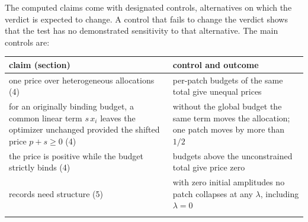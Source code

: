 The computed claims come with designated controls, alternatives on which
the verdict is expected to change. A control that fails to change the
verdict shows that the test has no demonstrated sensitivity to that
alternative. The main controls are:

\begin{longtable}[]{@{}ll@{}}
\toprule
\begin{minipage}[b]{0.47\columnwidth}\raggedright
claim (section)\strut
\end{minipage} & \begin{minipage}[b]{0.47\columnwidth}\raggedright
control and outcome\strut
\end{minipage}\tabularnewline
\midrule
\endhead
\begin{minipage}[t]{0.47\columnwidth}\raggedright
one price over heterogeneous allocations (4)\strut
\end{minipage} & \begin{minipage}[t]{0.47\columnwidth}\raggedright
per-patch budgets of the same total give unequal prices\strut
\end{minipage}\tabularnewline
\begin{minipage}[t]{0.47\columnwidth}\raggedright
for an originally binding budget, a common linear term \(s\,x_i\) leaves
the optimizer unchanged provided the shifted price \(p+s\ge0\) (4)\strut
\end{minipage} & \begin{minipage}[t]{0.47\columnwidth}\raggedright
without the global budget the same term moves the allocation; one patch
moves by more than \(1/2\)\strut
\end{minipage}\tabularnewline
\begin{minipage}[t]{0.47\columnwidth}\raggedright
the price is positive while the budget strictly binds (4)\strut
\end{minipage} & \begin{minipage}[t]{0.47\columnwidth}\raggedright
budgets above the unconstrained total give price zero\strut
\end{minipage}\tabularnewline
\begin{minipage}[t]{0.47\columnwidth}\raggedright
records need structure (5)\strut
\end{minipage} & \begin{minipage}[t]{0.47\columnwidth}\raggedright
with zero initial amplitudes no patch collapses at any \(\lambda\),
including \(\lambda=0\)\strut
\end{minipage}\tabularnewline
\begin{minipage}[t]{0.47\columnwidth}\raggedright

\end{minipage}
\end{longtable}
